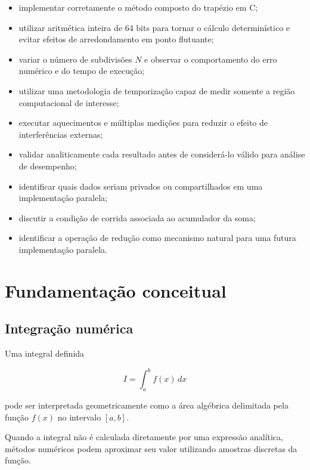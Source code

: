 \begin{itemize}
    \item implementar corretamente o método composto do trapézio em C;
    \item utilizar aritmética inteira de 64 bits para tornar o cálculo
    determinístico e evitar efeitos de arredondamento em ponto flutuante;
    \item variar o número de subdivisões \(N\) e observar o comportamento do
    erro numérico e do tempo de execução;
    \item utilizar uma metodologia de temporização capaz de medir somente a
    região computacional de interesse;
    \item executar aquecimentos e múltiplas medições para reduzir o efeito de
    interferências externas;
    \item validar analiticamente cada resultado antes de considerá-lo válido
    para análise de desempenho;
    \item identificar quais dados seriam privados ou compartilhados em uma
    implementação paralela;
    \item discutir a condição de corrida associada ao acumulador da soma;
    \item identificar a operação de redução como mecanismo natural para uma
    futura implementação paralela.
\end{itemize}


\section{Fundamentação conceitual}

\label{sec:atvd04-fundamentacao}

\subsection{Integração numérica}

Uma integral definida

\begin{equation}
    I = \int_a^b f(x)\,dx
\end{equation}

pode ser interpretada geometricamente como a área algébrica delimitada pela
função \(f(x)\) no intervalo \([a,b]\).

Quando a integral não é calculada diretamente por uma expressão analítica,
métodos numéricos podem aproximar seu valor utilizando amostras discretas da
função.

